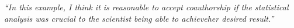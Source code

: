 \documentclass[12pt]{beamer}
\newcommand\ans[1]{{\it ``#1''}}
\begin{document}
\begin{frame}
\ans{In  this  example,  I  think  it  is  reasonable  to  accept coauthorship if the statistical analysis was crucial to the scientist being able to achieveher desired result.}











\end{frame}
\end{document}
